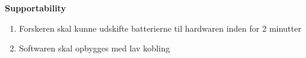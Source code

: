 \textbf{Supportability}
\begin{enumerate}
\item Forskeren skal kunne udskifte batterierne til hardwaren inden for 2 minutter 
\item Softwaren skal opbygges med lav kobling
\end{enumerate}
















